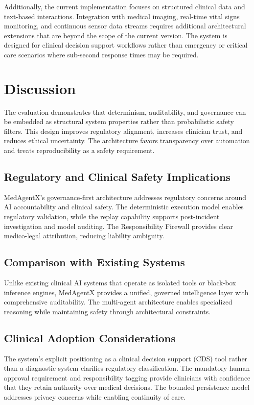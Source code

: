 \documentclass[conference]{IEEEtran}
\begin{document}
Additionally, the current implementation focuses on structured clinical data and text-based interactions. Integration with medical imaging, real-time vital signs monitoring, and continuous sensor data streams requires additional architectural extensions that are beyond the scope of the current version. The system is designed for clinical decision support workflows rather than emergency or critical care scenarios where sub-second response times may be required.

\section{Discussion}
The evaluation demonstrates that determinism, auditability, and governance can be embedded as structural system properties rather than probabilistic safety filters. This design improves regulatory alignment, increases clinician trust, and reduces ethical uncertainty. The architecture favors transparency over automation and treats reproducibility as a safety requirement.

\subsection{Regulatory and Clinical Safety Implications}
MedAgentX's governance-first architecture addresses regulatory concerns around AI accountability and clinical safety. The deterministic execution model enables regulatory validation, while the replay capability supports post-incident investigation and model auditing. The Responsibility Firewall provides clear medico-legal attribution, reducing liability ambiguity.

\subsection{Comparison with Existing Systems}
Unlike existing clinical AI systems that operate as isolated tools or black-box inference engines, MedAgentX provides a unified, governed intelligence layer with comprehensive auditability. The multi-agent architecture enables specialized reasoning while maintaining safety through architectural constraints.

\subsection{Clinical Adoption Considerations}
The system's explicit positioning as a clinical decision support (CDS) tool rather than a diagnostic system clarifies regulatory classification. The mandatory human approval requirement and responsibility tagging provide clinicians with confidence that they retain authority over medical decisions. The bounded persistence model addresses privacy concerns while enabling continuity of care.
\end{document}
